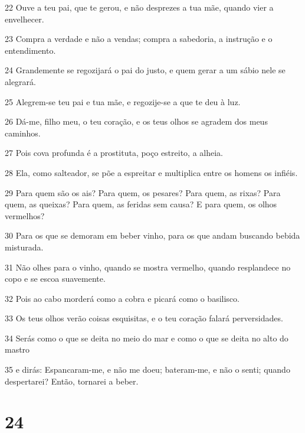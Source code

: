 \par 22 Ouve a teu pai, que te gerou, e não desprezes a tua mãe, quando vier a envelhecer.
\par 23 Compra a verdade e não a vendas; compra a sabedoria, a instrução e o entendimento.
\par 24 Grandemente se regozijará o pai do justo, e quem gerar a um sábio nele se alegrará.
\par 25 Alegrem-se teu pai e tua mãe, e regozije-se a que te deu à luz.
\par 26 Dá-me, filho meu, o teu coração, e os teus olhos se agradem dos meus caminhos.
\par 27 Pois cova profunda é a prostituta, poço estreito, a alheia.
\par 28 Ela, como salteador, se põe a espreitar e multiplica entre os homens os infiéis.
\par 29 Para quem são os ais? Para quem, os pesares? Para quem, as rixas? Para quem, as queixas? Para quem, as feridas sem causa? E para quem, os olhos vermelhos?
\par 30 Para os que se demoram em beber vinho, para os que andam buscando bebida misturada.
\par 31 Não olhes para o vinho, quando se mostra vermelho, quando resplandece no copo e se escoa suavemente.
\par 32 Pois ao cabo morderá como a cobra e picará como o basilisco.
\par 33 Os teus olhos verão coisas esquisitas, e o teu coração falará perversidades.
\par 34 Serás como o que se deita no meio do mar e como o que se deita no alto do mastro
\par 35 e dirás: Espancaram-me, e não me doeu; bateram-me, e não o senti; quando despertarei? Então, tornarei a beber.

\chapter{24}

